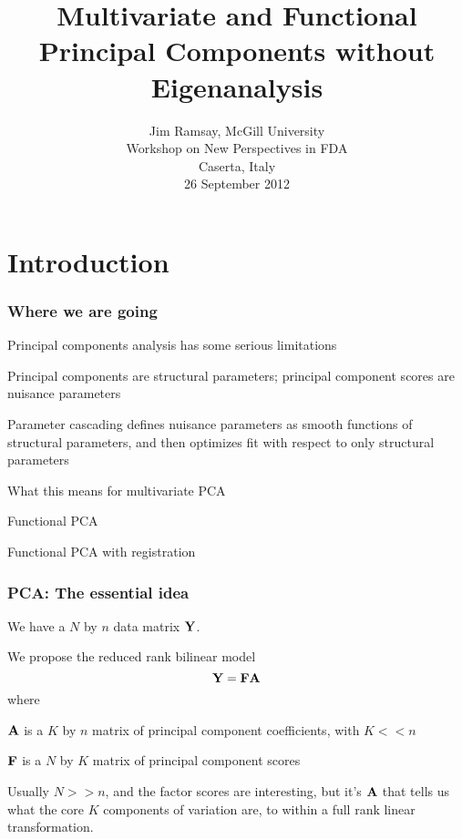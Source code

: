 \documentclass[11pt]{beamer}
\title{Multivariate and Functional Principal Components without Eigenanalysis}
\author{Jim Ramsay, McGill University \\
        Workshop on New Perspectives in FDA \\
        Caserta, Italy \\
        26 September 2012}
\date{}
\begin{document}
\begin{frame}

\maketitle


\end{frame}


\section[Overview]{Introduction}


\begin{frame}

\frametitle{Where we are going}

\bi
  \item Principal components analysis has some serious limitations
  \item Principal components are structural parameters; principal component scores are nuisance parameters
  \item Parameter cascading defines nuisance parameters as smooth functions of structural parameters,
  and then optimizes fit with respect to only structural parameters
  \item What this means for multivariate PCA
  \item Functional PCA
  \item Functional PCA with registration
\ei

\end{frame}


\begin{frame}

\frametitle{PCA: The essential idea}

\bi
  \item We have a $N$ by $n$ data matrix $\mbox{\bf Y}$.
  \item We propose the reduced rank bilinear model
  \[
    \mbox{\bf Y} = \mbox{\bf F} \mbox{\bf A}
  \]
  where
    \bi
      \item $\mbox{\bf A}$ is a $K$ by $n$ matrix of principal component coefficients, with $K << n$
      \item $\mbox{\bf F}$ is a $N$ by $K$ matrix of principal component scores
    \ei
  \item Usually $N >> n$, and the factor scores are interesting, but it's $\mbox{\bf A}$ that tells
  us what the core $K$ components of variation are, to within a full rank linear transformation.
\ei

\end{frame}
\end{document}
